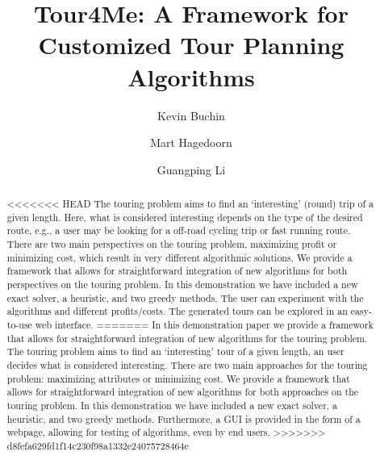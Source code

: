 \documentclass[sigconf,natbib=false]{acmart}
\begin{document}
\title{Tour4Me: A Framework for Customized Tour Planning Algorithms}


\author{Kevin Buchin}

\author{Mart Hagedoorn}

\author{Guangping Li}

\renewcommand{\shortauthors}{Buchin, Hagedoorn, and Li}
\newcommand{\tG}{\textsc{Tour4Me}\xspace}

\begin{abstract}
<<<<<<< HEAD
The touring problem aims to find an `interesting' (round) trip of a given length. Here, what is considered interesting depends on the type of the desired route, e.g., a user may be looking for a off-road cycling trip or fast running route.
There are two main perspectives on the touring problem, maximizing profit or minimizing cost, which result in very different algorithmic solutions. We provide a framework that allows for straightforward integration of new algorithms for both perspectives on the touring problem.
In this demonstration we have included a new exact solver, a heuristic, and two greedy methods. The user can experiment with the algorithms and different profits/costs. The generated tours can be explored in an easy-to-use web interface.
=======
In this demonstration paper we provide a framework that allows for straightforward integration of new algorithms for the touring problem. 
The touring problem aims to find an `interesting' tour of a given length, an user decides what is considered interesting.
There are two main approaches for the touring problem: maximizing attributes or minimizing cost.
We provide a framework that allows for straightforward integration of new algorithms for both approaches on the touring problem. 
In this demonstration we have included a new exact solver, a heuristic, and two greedy methods.
Furthermore, a GUI is provided in the form of a webpage, allowing for testing of algorithms, even by end users.
>>>>>>> d8fefa629fd1f14c230f98a1332e24075728464e
\end{abstract}
\end{document}
